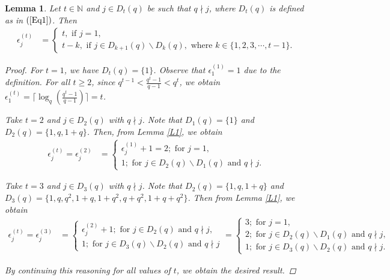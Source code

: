 \documentclass[pdflatex,sn-mathphys-num]{sn-jnl}%
\newtheorem{lemma}{Lemma}
\theoremstyle{thmstyleone}%
\theoremstyle{thmstyletwo}%
\theoremstyle{thmstylethree}%
\begin{document}
\begin{lemma}\label{L2}
    Let $t\in\mathbb{N}$ and $j\in D_{t}(q)$ be such that $q\nmid j$, where $D_{t}(q)$ is defined as in $(\ref{Eq1})$. Then
    \begin{align*}
        \epsilon_{j}^{(t)} &=\begin{cases}
            t,\text{ if }j=1, \\
            t-k,\text{ if }j\in D_{k+1}(q)\backslash D_{k}(q),\text{ where }k\in\{1,2,3,\cdots,t-1\}.
        \end{cases}
    \end{align*}
    \begin{proof}
        For $t=1$, we have $D_{t}(q)=\{1\}$. Observe that $\epsilon_{1}^{(1)}=1$ due to the definition. For all $t\geq 2$, since $q^{t-1}<\frac{q^t-1}{q-1}<q^t$, we obtain $\epsilon_{1}^{(t)}=\Big\lceil\operatorname{log}_{q}\left(\frac{q^t-1}{q-1}\right)\Big\rceil=t$.
       \par Take $t=2$ and $j\in D_{2}(q)$ with $q\nmid j$. Note that $D_{1}(q)=\{1\}$ and $D_{2}(q)=\{1,q,1+q\}$. Then, from Lemma \ref{L1}, we obtain
       \begin{align*}
           \epsilon_{j}^{(t)}=\epsilon_{j}^{(2)} &=\begin{cases}
               \epsilon_{j}^{(1)}+1=2;\text{ for }j=1, \\
               1;\text{ for }j\in D_{2}(q)\backslash D_{1}(q)\text{ and }q\nmid j.
           \end{cases}
       \end{align*}
       \par Take $t=3$ and $j\in D_{3}(q)$ with $q\nmid j$. Note that $D_{2}(q)=\{1,q,1+q\}$ and $D_{3}(q)=\{1,q,q^2,1+q,1+q^2,q+q^2,1+q+q^2\}$. Then from Lemma \ref{L1}, we obtain
        \begin{align*}
           \epsilon_{j}^{(t)}=\epsilon_{j}^{(3)} &=\begin{cases}
               \epsilon_{j}^{(2)}+1;\text{ for }j\in D_{2}(q)\text{ and }q\nmid j, \\
               1;\text{ for }j\in D_{3}(q)\backslash D_{2}(q)\text{ and }q\nmid j
           \end{cases}
           =\begin{cases}
               3;\text{ for }j=1, \\
               2;\text{ for }j\in D_{2}(q)\backslash D_{1}(q)\text{ and }q\nmid j, \\
               1;\text{ for }j\in D_{3}(q)\backslash D_{2}(q)\text{ and }q\nmid j.
           \end{cases}
       \end{align*}
       \vskip 1pt
     \par  By continuing this reasoning for all values of $t$, we obtain the desired result.
    \end{proof}
\end{lemma}
\end{document}
